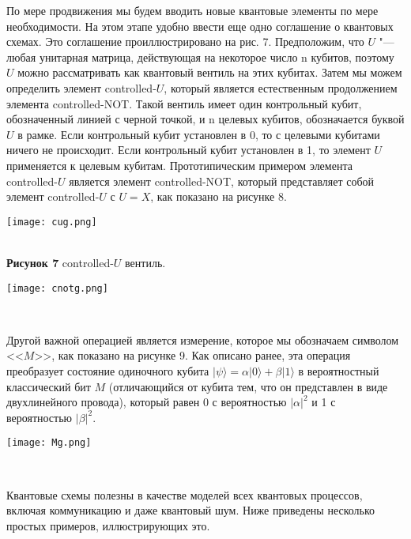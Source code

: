 \begin{multicols}{2}
{        По мере продвижения мы будем вводить новые квантовые элементы по мере необходимости. На этом этапе удобно ввести еще одно соглашение о квантовых схемах. Это соглашение
        проиллюстрировано на рис. 7. Предположим, что $U$ "--- любая унитарная матрица, действующая на некоторое число n
        кубитов, поэтому $U$ можно рассматривать как квантовый вентиль на этих кубитах. Затем мы можем определить
        элемент controlled-$U$, который является естественным продолжением элемента controlled-NOT. Такой вентиль
        имеет один контрольный кубит, обозначенный линией с черной точкой, и n целевых кубитов,
        обозначается буквой $U$ в рамке. Если контрольный кубит установлен в 0, то с
        целевыми кубитами ничего не происходит. Если контрольный кубит установлен в 1, то элемент $U$ применяется к целевым кубитам.
        Прототипическим примером элемента controlled-$U$ является элемент controlled-NOT, который представляет
        собой элемент controlled-$U$ с $U = X$, как показано на рисунке 8.
    }\\
    \begin{center}
        \begin{minipage}{0.3\textwidth}{\texttt{[image: cug.png]}}
        \end{minipage}\\
        \vspace{0.3cm}
        \footnotesize{\textbf{Рисунок 7} controlled-$U$ вентиль.}
    \end{center}
    \begin{flushleft}
        \begin{minipage}{0.3\textwidth}{\texttt{[image: cnotg.png]}}
        \end{minipage}\\
        \vspace{0.3cm}
    \end{flushleft}
    \normalsize{
        Другой важной операцией является измерение, которое мы обозначаем символом <<$M$>>, как показано на рисунке 9. Как описано ранее, эта операция преобразует
        состояние одиночного кубита $\vert\psi\rangle = \alpha\vert0\rangle + \beta\vert1\rangle$ в вероятностный классический бит $M$ (отличающийся от кубита
        тем, что он представлен в виде двухлинейного провода), который равен 0 с вероятностью $\vert\alpha\vert^2$ и 1 с вероятностью $\vert\beta\vert^2$.
    }\\
    \begin{center}
        \begin{minipage}{0.3\textwidth}{\texttt{[image: Mg.png]}}
        \end{minipage}\\
        \vspace{0.3cm}
    \end{center}
    \normalsize{
        Квантовые схемы полезны в качестве моделей всех квантовых процессов, включая коммуникацию и даже квантовый шум. Ниже приведены несколько простых
        примеров, иллюстрирующих это.
    }\\

\end{multicols}
